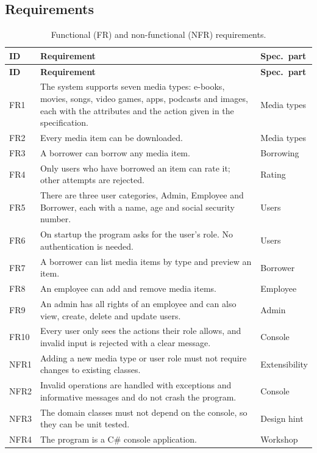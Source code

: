 \subsection{Requirements}

\small
\renewcommand{\arraystretch}{1.2}
\begin{longtable}{|>{\raggedright\arraybackslash}p{}|>{\raggedright\arraybackslash}p{}|>{\raggedright\arraybackslash}p{}|}
\caption{Functional (FR) and non-functional (NFR) requirements.}\\
\hline
\textbf{ID} & \textbf{Requirement} & \textbf{Spec.\ part}\\ \hline
\endfirsthead
\hline
\textbf{ID} & \textbf{Requirement} & \textbf{Spec.\ part}\\ \hline
\endhead
FR1 & The system supports seven media types: e-books, movies, songs, video games, apps, podcasts and images, each with the attributes and the action given in the specification. & Media types\\ \hline
FR2 & Every media item can be downloaded. & Media types\\ \hline
FR3 & A borrower can borrow any media item. & Borrowing\\ \hline
FR4 & Only users who have borrowed an item can rate it; other attempts are rejected. & Rating\\ \hline
FR5 & There are three user categories, Admin, Employee and Borrower, each with a name, age and social security number. & Users\\ \hline
FR6 & On startup the program asks for the user's role. No authentication is needed. & Users\\ \hline
FR7 & A borrower can list media items by type and preview an item. & Borrower\\ \hline
FR8 & An employee can add and remove media items. & Employee\\ \hline
FR9 & An admin has all rights of an employee and can also view, create, delete and update users. & Admin\\ \hline
FR10 & Every user only sees the actions their role allows, and invalid input is rejected with a clear message. & Console\\ \hline
NFR1 & Adding a new media type or user role must not require changes to existing classes. & Extensibility\\ \hline
NFR2 & Invalid operations are handled with exceptions and informative messages and do not crash the program. & Console\\ \hline
NFR3 & The domain classes must not depend on the console, so they can be unit tested. & Design hint\\ \hline
NFR4 & The program is a C\# console application. & Workshop\\ \hline
\end{longtable}
\normalsize

